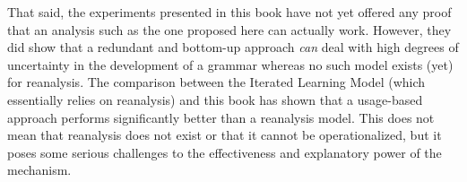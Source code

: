 That said, the experiments presented in this book have not yet offered any proof that an analysis such as the one proposed here can actually work. However, they did show that a redundant and bottom-up approach {\em can} deal with high degrees of uncertainty in the development of a grammar whereas no such model exists (yet) for reanalysis. The comparison between the Iterated Learning Model (which essentially relies on reanalysis) and this book has shown that a usage-based approach performs significantly better than a reanalysis model. This does not mean that reanalysis does not exist or that it cannot be operationalized, but it poses some serious challenges to the effectiveness and explanatory power of the mechanism.




